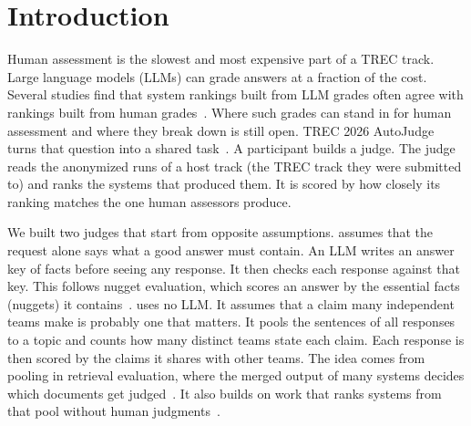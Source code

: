 \section{Introduction}

Human assessment is the slowest and most expensive part of a TREC track. Large
language models (LLMs) can grade answers at a fraction of the cost. Several
studies find that system rankings built from LLM grades often agree with rankings
built from human
grades~\cite{faggioli2023perspectives,thomas2024predict,upadhyay2024umbrela,pradeep2025greatnugget}.
Where such grades can stand in for human assessment and where they break down is
still open. TREC 2026 AutoJudge turns that question into a shared
task~\cite{autojudge2026}. A participant builds a judge. The judge reads the
anonymized runs of a host track (the TREC track they were submitted to) and ranks the systems
that produced them. It is scored by how closely its ranking matches the one human
assessors produce.

We built two judges that start from opposite assumptions. 
assumes that the request alone says what a good answer must contain. An LLM writes
an answer key of facts before seeing any response. It then checks each
response against that key. This follows nugget evaluation, which scores an answer by the
essential facts (nuggets) it
contains~\cite{voorhees2003qa,lin2006methods,pradeep2024initial}.
 uses no LLM. It assumes that a claim many independent teams
make is probably one that matters. It pools the sentences of all responses to a
topic and counts how many distinct teams state each claim. Each response is then
scored by the claims it shares with other teams. The idea comes from pooling in
retrieval evaluation, where the merged output of many systems decides which
documents get judged~\cite{zobel1998reliable}. It also builds on work that ranks
systems from that pool without human judgments~\cite{soboroff2001ranking}.

